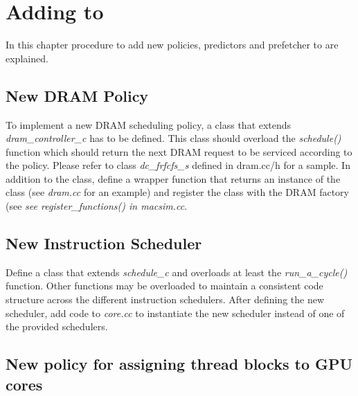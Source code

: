 \chapter{Adding to \SIM}
\label{sec:add_macsim}
In this chapter procedure to add new policies, predictors and prefetcher 
to \SIM are explained.

\section{New DRAM Policy}


To implement a new DRAM scheduling policy, a class that extends
\textit{dram\_controller\_c} has to be defined. This class should
overload the \textit{schedule()} function which should return the next
DRAM request to be serviced according to the policy. Please refer to
class \textit{dc\_frfcfs\_s} defined in dram.cc/h for a sample. In
addition to the class, define a wrapper function that returns an
instance of the class (see \textit{dram.cc} for an example) and
register the class with the DRAM factory (see \textit{see
register\_functions() in \textit{macsim.cc}}.


\section{New Instruction Scheduler}

Define a class that extends \textit{schedule\_c} and overloads at least the
\textit{run\_a\_cycle()} function. Other functions may be overloaded to
maintain a consistent code structure across the different instruction
schedulers. After defining the new scheduler, add code to \textit{core.cc} to
instantiate the new scheduler instead of one of the provided schedulers.

\section{New policy for assigning thread blocks to GPU cores}

